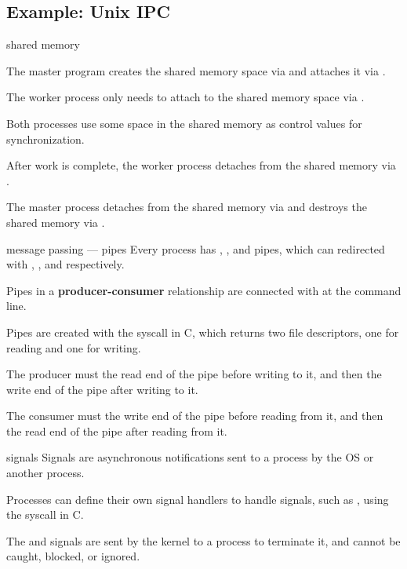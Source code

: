 \subsection{Example: Unix IPC}

\begin{defn*}{shared memory}
    \begin{enumerate*}
        \item The master program creates the shared memory space via  and attaches it via .
        \item The worker process only needs to attach to the shared memory space via .
        \item Both processes use some space in the shared memory as control values for synchronization.
        \item After work is complete, the worker process detaches from the shared memory via .
        \item The master process detaches from the shared memory via  and destroys the shared memory via .
    \end{enumerate*}
\end{defn*}

\begin{defn*}{message passing --- pipes}
    Every process has , , and  pipes,
    which can redirected with \code{<}, \code{>}, and  respectively.
    
    Pipes in a \textbf{producer-consumer} relationship are connected with \code{|} at the command line.

    Pipes are created with the  syscall in C, which returns two file descriptors, one for reading and one for writing.

    The producer must  the read end of the pipe before writing to it, and then  the write end of the pipe after writing to it.

    The consumer must  the write end of the pipe before reading from it, and then  the read end of the pipe after reading from it.
\end{defn*}

\begin{defn}{signals}
    Signals are asynchronous notifications sent to a process by the OS or another process.

    Processes can define their own signal handlers to handle signals,
    such as , using the  syscall in C.

    The  and  signals are sent by the kernel to a process to terminate it, and cannot be caught, blocked, or ignored.
\end{defn}